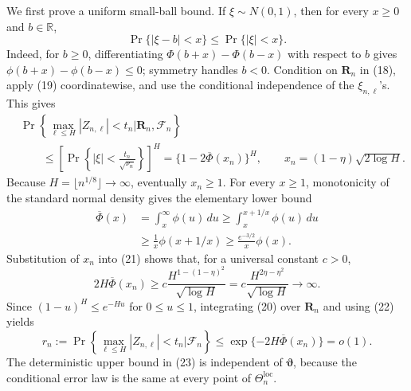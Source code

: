 We first prove a uniform small-ball bound.  If \(\xi\sim N(0,1)\), then for
every \(x\geq0\) and \(b\in\mathbb R\),
\[
 \Pr\{|\xi-b|<x\}\leq\Pr\{|\xi|<x\}.                       \tag{19}
\]
Indeed, for \(b\geq0\), differentiating
\(\Phi(b+x)-\Phi(b-x)\) with respect to \(b\) gives
\(\phi(b+x)-\phi(b-x)\leq0\); symmetry handles \(b<0\).
Condition on \(\boldsymbol R_n\) in (18), apply (19) coordinatewise, and use
the conditional independence of the \(\xi_{n,\ell}\)'s.  This gives
\[
\begin{aligned}
 &\Pr\left\{\max_{\ell\leq H}|Z_{n,\ell}|<t_n
       \mathrel{\big|}\boldsymbol R_n,\mathcal F_n\right\}\\
 &\qquad\leq
 \left[\Pr\left\{|\xi|<\frac{t_n}{\sqrt{\nu_n}}\right\}\right]^H
 =\{1-2\overline\Phi(x_n)\}^{H},
 \qquad x_n=(1-\eta)\sqrt{2\log H}.                         \tag{20}
\end{aligned}
\]
Because \(H=\lfloor n^{1/8}\rfloor\to\infty\), eventually \(x_n\geq1\).
For every \(x\geq1\), monotonicity of the standard normal density gives the
elementary lower bound
\[
\begin{aligned}
 \overline\Phi(x)
 &=\int_x^\infty\phi(u)\,du
 \geq\int_x^{x+1/x}\phi(u)\,du\\
 &\geq\frac1x\phi(x+1/x)
 \geq\frac{e^{-3/2}}{x}\phi(x).                             \tag{21}
\end{aligned}
\]
Substitution of \(x_n\) into (21) shows that, for a universal constant
\(c>0\),
\[
 2H\overline\Phi(x_n)
 \geq c\frac{H^{1-(1-\eta)^2}}{\sqrt{\log H}}
 =c\frac{H^{2\eta-\eta^2}}{\sqrt{\log H}}
 \longrightarrow\infty.                                    \tag{22}
\]
Since \((1-u)^H\leq e^{-Hu}\) for \(0\leq u\leq1\), integrating (20) over
\(\boldsymbol R_n\) and using (22) yields
\[
 r_n:=\Pr\left\{\max_{\ell\leq H}|Z_{n,\ell}|<t_n
                 \mathrel{\big|}\mathcal F_n\right\}
 \leq\exp\{-2H\overline\Phi(x_n)\}=o(1).                  \tag{23}
\]
The deterministic upper bound in (23) is independent of
\(\boldsymbol\vartheta\), because the conditional error law is the same at
every point of \(\Theta_n^{\mathrm{loc}}\).

